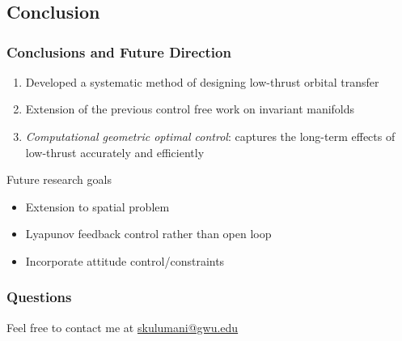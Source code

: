 

\section*{}
\subsection*{Conclusion}
\begin{frame} %
\frametitle{Conclusions and Future Direction}
  \begin{enumerate}
    \item<+-> Developed a systematic method of designing low-thrust orbital transfer
    \item<+-> Extension of the previous control free work on invariant manifolds
    \item<+-> \emph{Computational geometric optimal control}: captures the long-term effects of low-thrust accurately and efficiently   
  \end{enumerate}
  \pause
  Future research goals
    \begin{itemize} 
      \item Extension to spatial problem 
      \item Lyapunov feedback control rather than open loop 
      \item Incorporate attitude control/constraints 
    \end{itemize}
\end{frame}   %

\begin{frame} %
\frametitle{Questions}

Feel free to contact me at \href{mailto:skulumani@gwu.edu}{skulumani@gwu.edu}
\end{frame} %

